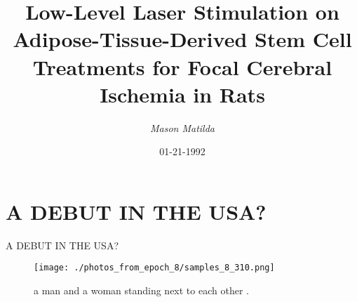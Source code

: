 \documentclass{article}%
\title{Low{-}Level Laser Stimulation on Adipose{-}Tissue{-}Derived Stem Cell Treatments for Focal Cerebral Ischemia in Rats}%
\author{\textit{Mason Matilda}}%
\date{01-21-1992}%
\begin{document}
%
\normalsize%
\maketitle%
\section{A DEBUT IN THE USA?\newline%
}%
\label{sec:ADEBUTINTHEUSA?}%
A DEBUT IN THE USA?\newline%

%


\begin{figure}[h!]%
\centering%
\texttt{[image: ./photos\_from\_epoch\_8/samples\_8\_310.png]}%
\caption{a man and a woman standing next to each other .}%
\end{figure}

%
\end{document}

